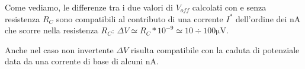 Come vediamo, le differenze tra i due valori di $V_{off}$ calcolati con e senza resistenza $R_C$ sono compatibili al contributo di una corrente $I^*$ dell'ordine dei \si{\nano\ampere} che scorre nella resistenza $R_C$: $\Delta V \simeq R_C * 10^{-9} \simeq 10\div100 \si{\micro\volt}$.

Anche nel caso non invertente $\Delta V$ risulta compatibile con la caduta di potenziale data da una corrente di base di alcuni \si{\nano\ampere}.















































































